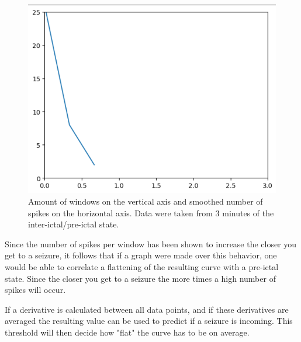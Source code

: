 \begin{figure}
    \centering
\includegraphics[width=0.4\textheight]{images/540 no seizure.png}
    \caption{Amount of windows on the vertical axis and smoothed number of spikes on the horizontal axis. Data were taken from 3 minutes of the inter-ictal/pre-ictal state.}
    \label{fig:no seizure der}
\end{figure}


Since the number of spikes per window has been shown to increase the closer you get to a seizure, it follows that if a graph were made over this behavior, one would be able to correlate a flattening of the resulting curve with a pre-ictal state. Since the closer you get to a seizure the more times a high number of spikes will occur.


If a derivative is calculated between all data points, and if these derivatives are averaged the resulting value can be used to predict if a seizure is incoming. This threshold will then decide how "flat" the curve has to be on average.


